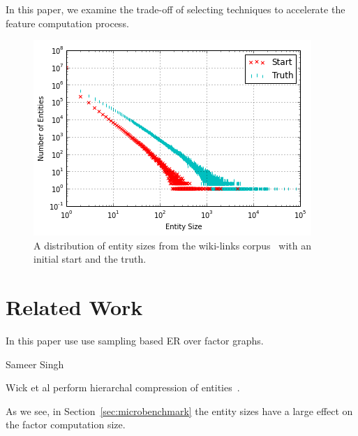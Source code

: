 In this paper, we examine the trade-off of selecting techniques to
accelerate the feature computation process.


\begin{figure}
\centering
\includegraphics[width=\columnwidth]{media/start-vs-nd.png}
\caption{A distribution of entity sizes from the wiki-links corpus~\cite{singh12:wiki-links} with an initial start and the truth.}
\label{fig:entity-distribution}
\end{figure}





\section{Related Work}

In this paper use use sampling based ER over factor graphs.

Sameer Singh~\cite{singh2011large}

Wick et al perform hierarchal compression of entities~\cite{Wick:2012:DHM:2390524.2390578}.


As we see, in Section~\ref{sec:microbenchmark} the entity sizes have a
large effect on the factor computation size.


